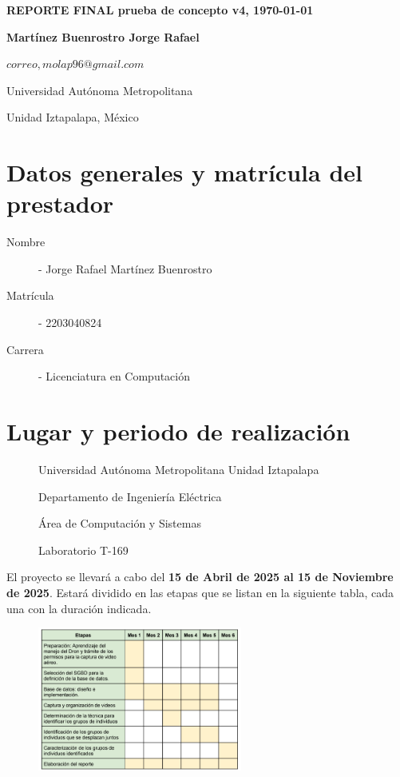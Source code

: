 \documentclass[letterpaper,11pt,twoside]{report}
\date{}
\begin{document}
	\centerline{\bf REPORTE FINAL prueba de concepto v4, \today}
	\centerline{}
	\begin{center}
		\Large{\textsc{}}
	\end{center}
	
	\centerline{}
	\centerline{\textbf{Martínez Buenrostro Jorge Rafael}}
	\centerline{}
	
	\centerline{$correo, molap96@gmail.com$}
	
        \centerline{Universidad Aut\'onoma Metropolitana} 
	\centerline{Unidad Iztapalapa, M\'exico}
	
	\bigskip


	\section{Datos generales y matrícula del prestador}
	\begin{description}
		\item[Nombre] - Jorge Rafael Mart\'inez Buenrostro
		\item[Matr\'icula] - 2203040824
		\item[Carrera] - Licenciatura en Computación
	\end{description}


	\section{Lugar y periodo de realizaci\'on}
	\begin{description}
		\item[] Universidad Aut\'onoma Metropolitana Unidad Iztapalapa
		\item[] Departamento de Ingenier\'ia El\'ectrica
		\item[] \'Area de Computaci\'on y Sistemas
		\item[] Laboratorio T-169
	\end{description}
	\noindent El proyecto se llevar\'a a cabo del \textbf{15 de Abril de 2025 al 15 de Noviembre de 2025}. Estar\'a dividido en las etapas
	que se listan en la siguiente tabla, cada una con la duraci\'on indicada.
	\begin{figure}[H]
		\centering
		\includegraphics[width=0.6\textwidth]{img/gantt.png}
	\end{figure}
\end{document}
